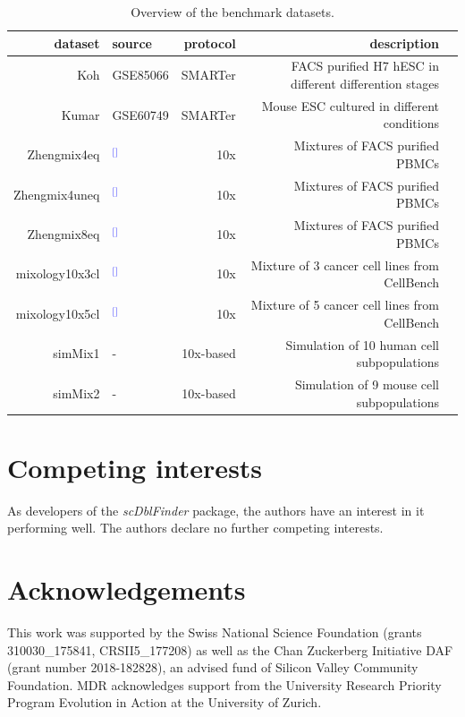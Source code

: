 \documentclass[11pt]{article}
\renewcommand{\cite}[1]{\textcolor{Blue}{$^[$\supercite{#1}$^]$}}
\begin{document}
\begin{table}[h!]
\caption{Overview of the benchmark datasets.}
\label{tab:table1}
\begin{tabular}{rlrrl}
  \hline
dataset & source & protocol & description \\ 
  \hline
Koh & GSE85066 & SMARTer & FACS purified H7 hESC in different differention stages \\ 
  Kumar & GSE60749 & SMARTer & Mouse ESC cultured in different conditions \\ 
  Zhengmix4eq & \cite{duoClustering2018} & 10x & Mixtures of FACS purified PBMCs \\ 
  Zhengmix4uneq & \cite{duoClustering2018} & 10x & Mixtures of FACS purified PBMCs \\ 
  Zhengmix8eq & \cite{duoClustering2018} & 10x & Mixtures of FACS purified PBMCs \\ 
  mixology10x3cl & \cite{tianMixology2018} & 10x & Mixture of 3  cancer cell lines from CellBench \\ 
  mixology10x5cl & \cite{tianMixology2018} & 10x & Mixture of 5 cancer cell lines from CellBench \\ 
  simMix1 & - & 10x-based & Simulation of 10 human cell subpopulations \\
  simMix2 & - & 10x-based & Simulation of 9 mouse cell subpopulations \\
   \hline
\end{tabular}
\end{table}




\begin{backmatter}

\section*{Competing interests}
As developers of the \textit{scDblFinder} package, the authors have an interest in it performing well. The authors declare no further competing interests.


\section*{Acknowledgements}
This work was supported by the Swiss National Science Foundation (grants 310030\_175841, CRSII5\_177208) as well as the Chan Zuckerberg Initiative DAF (grant number 2018-182828), an advised fund of Silicon Valley Community Foundation. MDR acknowledges support from the University Research Priority Program Evolution in Action at the University of Zurich.

\end{backmatter}

\clearpage
\singlespacing
\nolinenumbers
\printbibliography

\newpage
{}


% 
\end{document}
